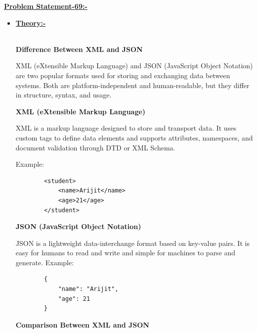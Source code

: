 \documentclass{article}
\newcommand{\prbst}[1]{
    \underline{\textbf{Problem Statement-{#1}:-}}
}
\newcommand{\questionbox}[1]{
  \begin{searchbox}
    \textbf{#1}
  \end{searchbox}
}
\begin{document}
\newpage
\LARGE{\prbst{69}}
\questionbox{{\qsixtynine}}
\begin{itemize}[label=]
    \item{\underline{\textbf{Theory:-}}} {\\
        \textbf{Difference Between XML and JSON}

        XML (eXtensible Markup Language) and JSON (JavaScript Object Notation) are two popular formats used for storing and exchanging data between systems. Both are platform-independent and human-readable, but they differ in structure, syntax, and usage.

        \textbf{XML (eXtensible Markup Language)}

        XML is a markup language designed to store and transport data. It uses custom tags to define data elements and supports attributes, namespaces, and document validation through DTD or XML Schema.

        Example:

        \begin{verbatim}
        <student>
            <name>Arijit</name>
            <age>21</age>
        </student>
        \end{verbatim}

        \textbf{JSON (JavaScript Object Notation)}

        JSON is a lightweight data-interchange format based on key-value pairs. It is easy for humans to read and write and simple for machines to parse and generate.
        \newpage
        Example:

        \begin{verbatim}
        {
            "name": "Arijit",
            "age": 21
        }
        \end{verbatim}

        \textbf{Comparison Between XML and JSON}

}
\end{itemize}
\end{document}
